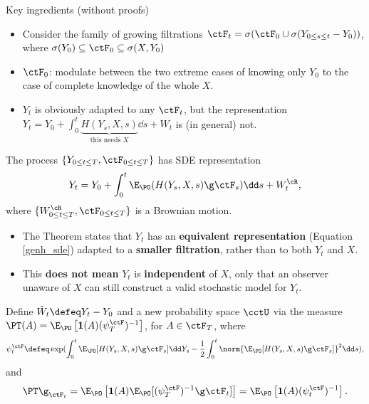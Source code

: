 \begin{frame}[allowframebreaks]{Key ingredients (without proofs)}
\begin{itemize}
    \item Consider the family of growing filtrations $\ctF_t=\sigma(\ctF_0\cup \sigma(Y_{0\leq s\leq t}-Y_0))$, where $\sigma(Y_0)\subseteq \ctF_0\subseteq \sigma(X,Y_0)$
    \item $\ctF_0$: modulate between the two extreme cases of knowing only $Y_0$ to the case of complete knowledge of the whole $X$.
    \item $Y_t$ is obviously adapted to any $\ctF_t$, but the representation $Y_t=Y_0+\int_0^t \underbrace{H(Y_s,X,s)}_{\text{this needs } X} \dd s+ W_t$ is (in general) not.
\end{itemize}
\framebreak

\begin{theorem}\label{innovation_theo}
The process $\{Y_{0\leq t\leq T},\ctF_{0\leq t\leq T}\}$ has \gls{SDE} representation 
\begin{equation}\label{genh_sde}
Y_t=Y_0+\int_0^t \E_{\PO}(H(Y_s,X,s)\g \ctF_s)\dd s + {W}^{\cR}_t,    
\end{equation}
where $\{{W}^{\cR}_{0\leq t\leq T},\ctF_{0\leq t\leq T}\}$ is a Brownian motion.
\end{theorem}

  \begin{itemize}
    \item The Theorem states that $Y_t$ has an\textbf{ equivalent representation} (Equation \ref{genh_sde}) adapted to a \textbf{smaller filtration}, rather than to both $Y_t$ and $X$.
    \item This \textbf{does not mean} $Y_t$ is \textbf{independent} of $X$, only that an observer unaware of $X$ can still construct a valid stochastic model for $Y_t$.
  \end{itemize}

\framebreak

\begin{theorem} \label{theo_girsa}
Define $\tilde{W}_t\defeq Y_t-Y_0$ and a new probability space $\cctU$ via the measure $\PT(A)=\E_{\PO}\left[ \mathbf{1}(A)({\psi^{\ctF}_T})^{-1}\right]$, for $A\in \ctF_T$, where 
\begin{equation}\label{radonniko}
\psi^{\ctF}_t\defeq \exp(\int_0^t \E_{\PO}[H(Y_s,X,s)\g\ctF_s]\dd Y_s-\frac{1}{2}\int_0^t\norm{\E_{\PO}[H(Y_s,X,s)\g\ctF_s]}^2 \dd s ),
\end{equation}
and  
$$\PT\g_{\ctF_t}=\E_{\PO}\left[ \mathbf{1}(A)\E_\PO[({\psi^{\ctF}_T})^{-1}\g\ctF_t]\right]=\E_{\PO}\left[ \mathbf{1}(A)({\psi^{\ctF}_t})^{-1}\right].$$ 



\end{theorem}
\end{frame}
